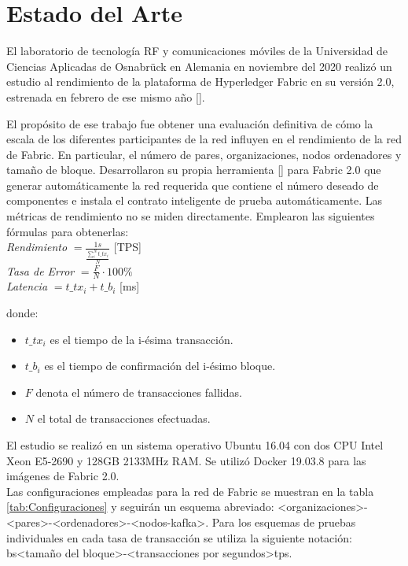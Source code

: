 \chapter{Estado del Arte}\label{chapter:state-of-the-art}

El laboratorio de tecnolog\'ia RF y comunicaciones m\'oviles de la Universidad de Ciencias Aplicadas de Osnabrück en Alemania en noviembre del 2020 realiz\'o un estudio al rendimiento de la plataforma de Hyperledger Fabric en su versi\'on 2.0, estrenada en febrero de ese mismo a\~no [\cite{dreyer2020performance}].

El prop\'osito de ese trabajo fue obtener una evaluaci\'on definitiva de c\'omo la escala de los diferentes participantes de la red influyen en el rendimiento de la red de Fabric. En particular, el n\'umero de pares, organizaciones, nodos ordenadores y tama\~no de bloque. Desarrollaron su propia herramienta [\cite{Configurator}] para Fabric 2.0 que generar autom\'aticamente la red requerida que contiene el n\'umero deseado de componentes e instala el contrato inteligente de prueba autom\'aticamente. Las m\'etricas de rendimiento no se miden directamente. Emplearon las siguientes f\'ormulas para obtenerlas:\\

\emph{Rendimiento} $ = \frac{1s}{\frac{ \sum_i^N t\_tx_i } {N} }$ [TPS]\\

\emph{Tasa de Error} $ = \frac{F}{N} \cdot 100\% $\\


\emph{Latencia} $ = t\_tx_i + t\_b_i$ [ms]

{\vspace{1 cm}}

donde:
\begin{itemize}
\item $t\_tx_i$ es el tiempo de la i-\'esima transacci\'on.
\item $t\_b_i$ es el tiempo de confirmaci\'on del i-\'esimo bloque.
\item $F$ denota el n\'umero de transacciones fallidas.
\item $N$ el total de transacciones efectuadas.  
\end{itemize}

El estudio se realiz\'o en un sistema operativo Ubuntu 16.04 con dos CPU Intel Xeon E5-2690 y 128GB 2133MHz RAM. Se utiliz\'o Docker 19.03.8 para las im\'agenes de Fabric 2.0.\\

Las configuraciones empleadas para la red de Fabric se muestran en la tabla \ref{tab:Configuraciones} y seguir\'an un esquema abreviado: <organizaciones>-<pares>-<ordenadores>-<nodos-kafka>. Para los esquemas de pruebas individuales en cada tasa de transacci\'on se utiliza la siguiente notaci\'on: bs<tama\~no del bloque>-<transacciones por segundos>tps.\\


